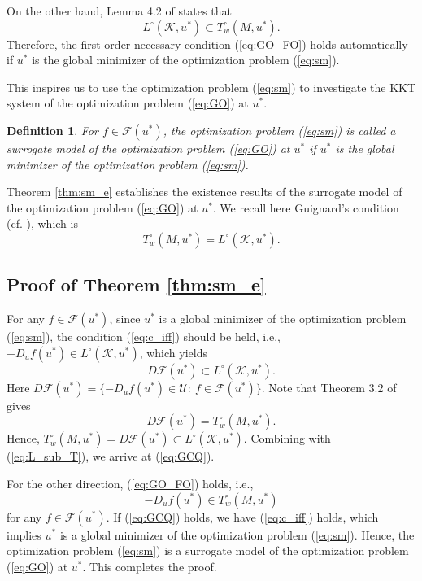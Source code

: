 \documentclass[leqno]{amsart}
\newtheorem{Definition}[Theorem]{Definition}
\theoremstyle{definition}
\begin{document}
On the other hand, Lemma 4.2 of \cite{gould1975optimality} states that
\begin{equation}\label{eq:L_sub_T}
L^\circ(\mathcal{K}, u^*) \subset T_w^\circ(M,u^*).
\end{equation}
Therefore, the first order necessary condition (\ref{eq:GO_FO}) holds automatically if $u^*$ is the global minimizer of the optimization problem (\ref{eq:sm}). 

 This inspires us to use  the optimization problem (\ref{eq:sm}) to investigate the KKT system of the optimization problem (\ref{eq:GO})  at $u^*$.

\begin{Definition}\label{def:sm}
For $f\in \mathcal{F}(u^*)$, the optimization problem (\ref{eq:sm}) is called a surrogate model of the optimization problem (\ref{eq:GO}) at $u^*$ if $u^*$ is the global minimizer of the optimization problem (\ref{eq:sm}).
\end{Definition}

Theorem \ref{thm:sm_e} establishes the existence results of the surrogate model of the optimization problem (\ref{eq:GO}) at $u^*$. We recall here Guignard's condition (cf. \cite{gould1975optimality, guignard1969generalized}), which is
\begin{equation}\label{eq:GCQ}
T_w^\circ(M,u^*) = L^{\circ}(\mathcal{K}, u^*).
\end{equation}

\subsection{Proof of Theorem \ref{thm:sm_e}} 
For any $f\in \mathcal{F}(u^*)$, since $u^*$ is a global minimizer of the optimization problem (\ref{eq:sm}),  the condition (\ref{eq:c_iff}) should be held, i.e.,
$ -D_uf(u^*)\in L^\circ(\mathcal{K},u^*)$,
which yields
$$D\mathcal{F}(u^*) \subset  L^\circ(\mathcal{K},u^*).$$
Here $D\mathcal{F}(u^*) = \{-D_uf(u^*)\in \mathcal{U}:\ f\in \mathcal{F}(u^*)\}$.
Note that Theorem 3.2 of \cite{gould1975optimality} gives
$$D\mathcal{F}(u^*) = T_w^\circ(M,u^*).$$
Hence, $T_w^\circ(M,u^*) = D\mathcal{F}(u^*)  \subset L^\circ(\mathcal{K}, u^*)$.
Combining with  (\ref{eq:L_sub_T}), we arrive at (\ref{eq:GCQ}).

For the other direction, (\ref{eq:GO_FO}) holds, i.e.,
$$-D_uf(u^*)\in T_w^\circ(M,u^*)$$
 for any $f\in \mathcal{F}(u^*)$. If (\ref{eq:GCQ}) holds, we have (\ref{eq:c_iff}) holds, which implies $u^*$ is a global minimizer of the optimization problem (\ref{eq:sm}). Hence, the optimization problem (\ref{eq:sm}) is a surrogate model of the optimization problem (\ref{eq:GO}) at $u^*$. This completes the proof.
\end{document}
